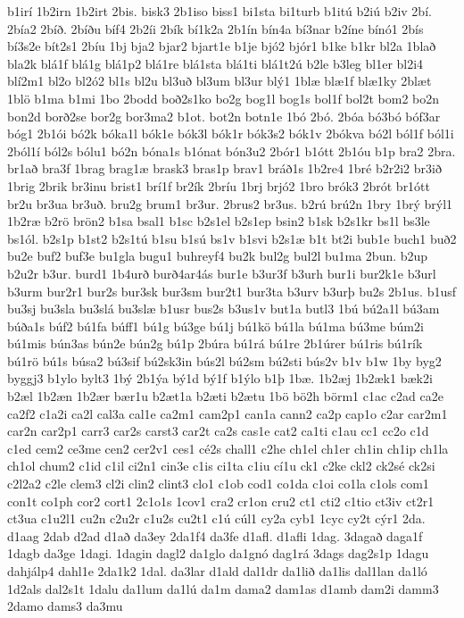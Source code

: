 {b1irí
1b2irn
1b2irt
2bis.
bisk3
2b1iso
biss1
bi1sta
bi1turb
b1itú
b2iú
b2iv
2bí.
2bía2
2bíð.
2bíðu
bíf4
2b2íi
2bík
bí1k2a
2b1ín
bín4a
bí3nar
b2íne
bínó1
2bís
bí3s2e
bít2s1
2bíu
1bj
bja2
bjar2
bjart1e
b1je
bjó2
bjór1
b1ke
b1kr
bl2a
1blað
bla2k
blá1f
blá1g
blá1p2
blá1re
blá1sta
blá1ti
blá1t2ú
b2le
b3leg
bl1er
bl2i4
blí2m1
bl2o
bl2ó2
bl1s
bl2u
bl3uð
bl3um
bl3ur
blý1
1blæ
blæ1f
blæ1ky
2blæt
1blö
b1ma
b1mi
1bo
2bodd
boð2s1ko
bo2g
bog1l
bog1s
bol1f
bol2t
bom2
bo2n
bon2d
borð2se
bor2g
bor3ma2
b1ot.
bot2n
botn1e
1bó
2bó.
2bóa
bó3bó
bóf3ar
bóg1
2b1ói
bó2k
bóka1l
bók1e
bók3l
bók1r
bók3s2
bók1v
2bókva
bó2l
ból1f
ból1i
2ból1í
ból2s
bólu1
bó2n
bóna1s
b1ónat
bón3u2
2bór1
b1ótt
2b1óu
b1p
bra2
2bra.
br1að
bra3f
1brag
brag1æ
brask3
bras1p
brav1
bráð1s
1b2re4
1bré
b2r2i2
br3ið
1brig
2brik
br3inu
brist1
brí1f
br2ík
2bríu
1brj
brjó2
1bro
brók3
2brót
br1ótt
br2u
br3ua
br3uð.
bru2g
brum1
br3ur.
2brus2
br3us.
b2rú
brú2n
1bry
1brý
brýl1
1b2ræ
b2rö
brön2
b1sa
bsal1
b1sc
b2s1el
b2s1ep
bsin2
b1sk
b2s1kr
bs1l
bs3le
bs1ól.
b2s1p
b1st2
b2s1tú
b1su
b1sú
bs1v
b1svi
b2s1æ
b1t
bt2i
bub1e
buch1
buð2
bu2e
buf2
buf3e
bu1gla
bugu1
buhreyf4
bu2k
bul2g
bul2l
bu1ma
2bun.
b2up
b2u2r
b3ur.
burd1
1b4urð
burð4ar4ás
bur1e
b3ur3f
b3urh
bur1i
bur2k1e
b3url
b3urm
bur2r1
bur2s
bur3sk
bur3sm
bur2t1
bur3ta
b3urv
b3urþ
bu2s
2b1us.
b1usf
bu3sj
bu3sla
bu3slá
bu3slæ
b1usr
bus2s
b3us1v
but1a
butl3
1bú
bú2a1l
bú3am
búða1s
búf2
bú1fa
búff1
bú1g
bú3ge
bú1j
bú1kö
bú1la
bú1ma
bú3me
búm2i
bú1mis
bún3as
bún2e
bún2g
bú1p
2búra
bú1rá
bú1re
2b1úrer
bú1ris
bú1rík
bú1rö
bú1s
búsa2
bú3sif
bú2sk3in
bús2l
bú2sm
bú2sti
bús2v
b1v
b1w
1by
byg2
byggj3
b1ylo
bylt3
1bý
2b1ýa
bý1d
bý1f
b1ýlo
b1þ
1bæ.
1b2æj
1b2æk1
bæk2i
b2æl
1b2æn
1b2ær
bær1u
b2æt1a
b2æti
b2ætu
1bö
bö2h
börm1
c1ac
c2ad
ca2e
ca2f2
c1a2i
ca2l
cal3a
cal1e
ca2m1
cam2p1
can1a
cann2
ca2p
cap1o
c2ar
car2m1
car2n
car2p1
carr3
car2s
carst3
car2t
ca2s
cas1e
cat2
ca1ti
c1au
cc1
cc2o
c1d
c1ed
cem2
ce3me
cen2
cer2v1
ces1
cé2s
chall1
c2he
ch1el
ch1er
ch1in
ch1ip
ch1la
ch1ol
chum2
c1id
c1il
ci2n1
cin3e
c1is
ci1ta
c1iu
cí1u
ck1
c2ke
ckl2
ck2sé
ck2si
c2l2a2
c2le
clem3
cl2i
clin2
clint3
clo1
c1ob
cod1
co1da
c1oi
co1la
c1ols
com1
con1t
co1ph
cor2
cort1
2c1o1s
1cov1
cra2
cr1on
cru2
ct1
cti2
c1tio
ct3iv
ct2r1
ct3ua
c1u2l1
cu2n
c2u2r
c1u2s
cu2t1
c1ú
cúl1
cy2a
cyb1
1cyc
cy2t
cýr1
2da.
d1aag
2dab
d2ad
d1að
da3ey
2da1f4
da3fe
d1afl.
d1afli
1dag.
3dagað
daga1f
1dagb
da3ge
1dagi.
1dagin
dagl2
da1glo
da1gnó
dag1rá
3dags
dag2s1p
1dagu
dahjálp4
dahl1e
2da1k2
1dal.
da3lar
d1ald
dal1dr
da1lið
da1lis
dal1lan
da1ló
1d2als
dal2s1t
1dalu
da1lum
da1lú
da1m
dama2
dam1as
d1amb
dam2i
damm3
2damo
dams3
da3mu
}
